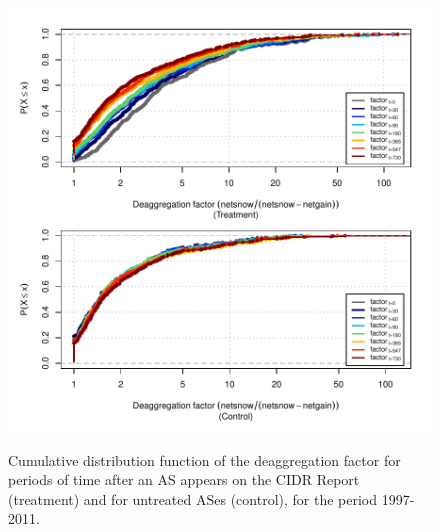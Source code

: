 
\begin{figure}[h!]
\begin{centering}
\begin{singlespace}
    \includegraphics[width=6in]
        {figures/behavior-deagg_factor-1997_2011-corr.pdf}
    \vspace{-2em}\\
    \caption{Cumulative distribution function of the deaggregation factor for
    periods of time after an AS appears on the CIDR Report (treatment) and for
    untreated ASes (control), for the period 1997-2011.}
    \label{fig:deagg_factor_cdf}
\end{singlespace}
\end{centering}
\end{figure}

